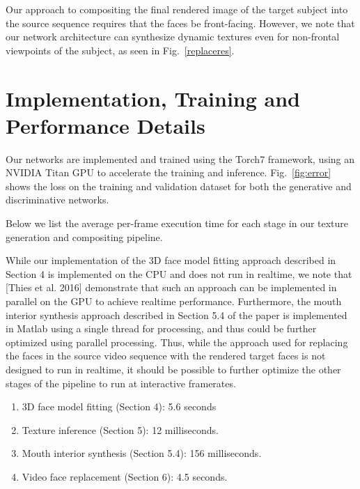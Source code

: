 \documentclass[10pt,twocolumn,letterpaper]{article}
\begin{document}
Our approach to compositing the final rendered image of the target subject into the source sequence requires that the faces be front-facing. However, we note that our network architecture can synthesize dynamic textures even for non-frontal viewpoints of the subject, as seen in Fig.~\ref{replaceres}.


\section{Implementation, Training and Performance Details}

Our networks are implemented and trained using the Torch7 framework, using an NVIDIA Titan GPU to accelerate the training and inference. Fig.~\ref{fig:error} shows the loss on the training and validation dataset for both the generative and discriminative networks.

Below we list the average per-frame execution time for each stage in our texture generation and compositing pipeline.

While our implementation of the 3D face model fitting approach described in Section 4 is implemented on the CPU and does not run in realtime, we note that [Thies et al. 2016] demonstrate that such an approach can be implemented in parallel on the GPU to achieve realtime performance. Furthermore, the mouth interior synthesis approach described in Section 5.4 of the paper is implemented in Matlab using a single thread for processing, and thus could be further optimized using parallel processing. Thus, while the approach used for replacing the faces in the source video sequence with the rendered target faces is not designed to run in realtime, it should be possible to further optimize the other stages of the pipeline to run at interactive framerates.




\begin{enumerate}
\item 3D face model fitting (Section 4): 5.6 seconds
\item Texture inference (Section 5): 12 milliseconds.
\item Mouth interior synthesis (Section 5.4): 156 milliseconds.
\item Video face replacement (Section 6): 4.5 seconds.
\end{enumerate}
\end{document}
